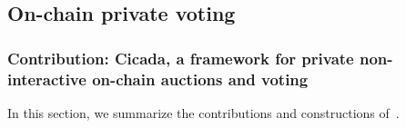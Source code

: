 \subsection{On-chain private voting}

\subsubsection{Contribution: Cicada, a framework for private non-interactive on-chain auctions and voting}

In this section, we summarize the contributions and constructions of~\cite{EPRINT:GSZB23}. 
